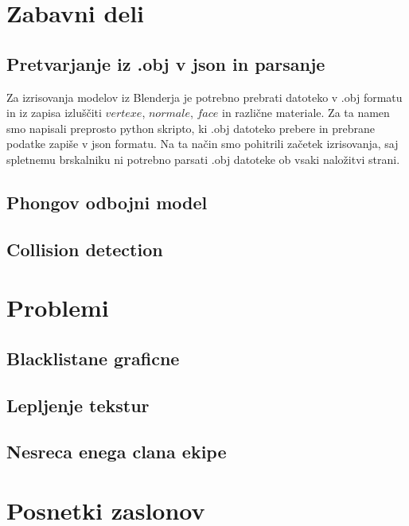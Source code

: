 \documentclass[10pt,a4paper]{article}
\begin{document}
\section{Zabavni deli}
\subsection{Pretvarjanje iz .obj v json in parsanje}
Za izrisovanja modelov iz Blenderja je potrebno prebrati datoteko v .obj formatu in iz zapisa
izluščiti $vertexe$, $normale$, $face$ in različne materiale. Za ta namen smo 
napisali preprosto python skripto, ki .obj datoteko prebere in prebrane podatke 
zapiše v json formatu. Na ta način smo pohitrili začetek izrisovanja, saj spletnemu
brskalniku ni potrebno parsati .obj datoteke ob vsaki naložitvi strani.
\subsection{Phongov odbojni model}
\subsection{Collision detection}
\pagebreak
\section{Problemi}
\subsection{Blacklistane graficne}
\subsection{Lepljenje tekstur}
\subsection{Nesreca enega clana ekipe}
\pagebreak
\section{Posnetki zaslonov}
\end{document}

